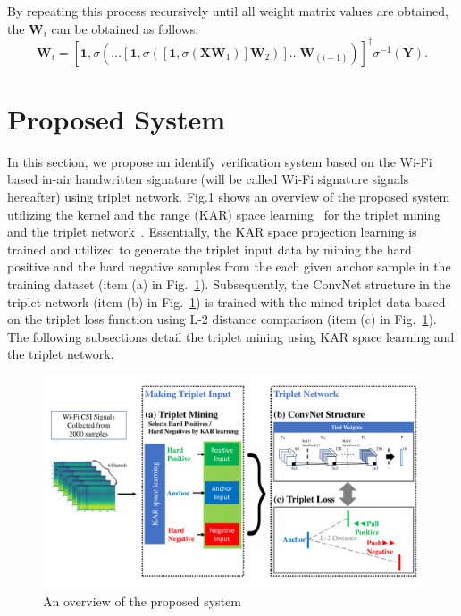 \documentclass[runningheads]{llncs}
\begin{document}
By repeating this process recursively until all weight matrix values are obtained, the $\mathbf{W}_{i}$ can be obtained as follows:
\begin{equation}
    \mathbf{W}_{i} = \left[\mathbf{1},\sigma\left(\dots\left[\mathbf{1},\sigma\left(\left[\mathbf{1},\sigma\left(\mathbf{X}\mathbf{W}_{1}\right)\right]\mathbf{W}_{2}\right)\right]\dots\mathbf{W}_{(i-1)}\right)\right]^{\dagger}\sigma^{-1}\left(\mathbf{Y}\right).
\end{equation}


\section{Proposed System}

In this section, we propose an identify verification system based on the Wi-Fi based in-air handwritten signature (will be called Wi-Fi signature signals hereafter) using triplet network. Fig.1 shows an overview of the proposed system utilizing the kernel and the range (KAR) space learning~\cite{toh2018learning,toh2018gradient} for the triplet mining and the triplet network~\cite{schroff2015facenet}.
Essentially, the KAR space projection learning is trained and utilized to generate the triplet input data by mining the hard positive and the hard negative samples from the each given anchor sample in the training dataset (item (a) in Fig.~\ref{fig1}).
Subsequently, the ConvNet structure in the triplet network (item (b) in Fig.~\ref{fig1}) is trained with the mined triplet data based on the triplet loss function using L-2 distance comparison (item (c) in Fig.~\ref{fig1}).
The following subsections detail the triplet mining using KAR space learning and the triplet network.

\begin{figure}
    \includegraphics[width=\textwidth]{fig1_tcnn_kar_v3}
    \caption{An overview of the proposed system} \label{fig1}
\end{figure}
\end{document}
